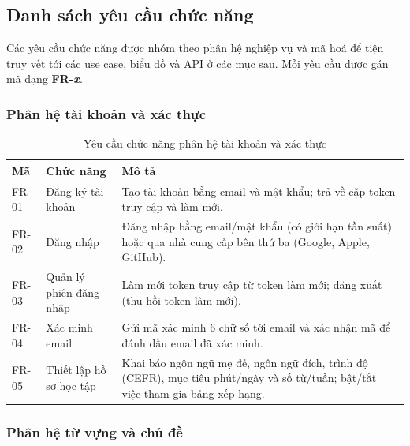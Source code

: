 \subsection{Danh sách yêu cầu chức năng}
\label{subsec:danh-sach-chuc-nang}

Các yêu cầu chức năng được nhóm theo phân hệ nghiệp vụ và mã hoá để tiện
truy vết tới các use case, biểu đồ và API ở các mục sau. Mỗi yêu cầu được
gán mã dạng \textbf{FR-\textit{x}}.

\subsubsection{Phân hệ tài khoản và xác thực}

\begin{table}[h]
  \centering
  \small
  \renewcommand{\arraystretch}{1.3}
  \begin{tabular}{|p{1.7cm}|p{3.4cm}|p{9.4cm}|}
    \hline
    \textbf{Mã} & \textbf{Chức năng} & \textbf{Mô tả} \\
    \hline
    FR-01 & Đăng ký tài khoản & Tạo tài khoản bằng email và mật khẩu; trả về cặp token truy cập và làm mới. \\
    \hline
    FR-02 & Đăng nhập & Đăng nhập bằng email/mật khẩu (có giới hạn tần suất) hoặc qua nhà cung cấp bên thứ ba (Google, Apple, GitHub). \\
    \hline
    FR-03 & Quản lý phiên đăng nhập & Làm mới token truy cập từ token làm mới; đăng xuất (thu hồi token làm mới). \\
    \hline
    FR-04 & Xác minh email & Gửi mã xác minh 6 chữ số tới email và xác nhận mã để đánh dấu email đã xác minh. \\
    \hline
    FR-05 & Thiết lập hồ sơ học tập & Khai báo ngôn ngữ mẹ đẻ, ngôn ngữ đích, trình độ (CEFR), mục tiêu phút/ngày và số từ/tuần; bật/tắt việc tham gia bảng xếp hạng. \\
    \hline
  \end{tabular}
  \caption{Yêu cầu chức năng phân hệ tài khoản và xác thực}
  \label{tab:fr-auth}
\end{table}

\subsubsection{Phân hệ từ vựng và chủ đề}

